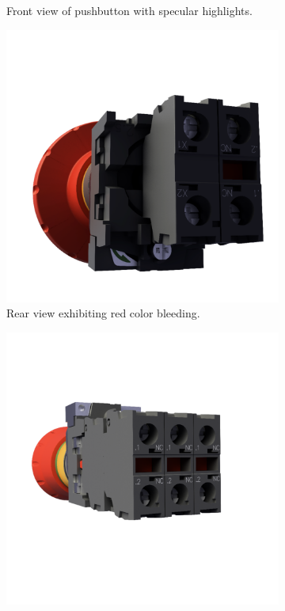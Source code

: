 \begin{figure}[H]
\begin{subfigure}[t]{0.4\textwidth}
        \caption{Front view of pushbutton with specular highlights.}
        \label{fig:demo-specular}
    \end{subfigure}
    \hspace*{1cm}
    \vfill
    \vspace*{0.5cm}
    \hspace*{1cm}
    \begin{subfigure}[t]{0.4\textwidth}
        \includegraphics[width=\textwidth]{resources/demo-color-bleeding.png}
        \caption{Rear view exhibiting red color bleeding.}
        \label{fig:demo-color-bleeding}
    \end{subfigure}
    \hfill
    \begin{subfigure}[t]{0.4\textwidth}
        \includegraphics[width=\textwidth]{resources/demo-ambient-occlusion.png}

\end{subfigure}
\end{figure}
